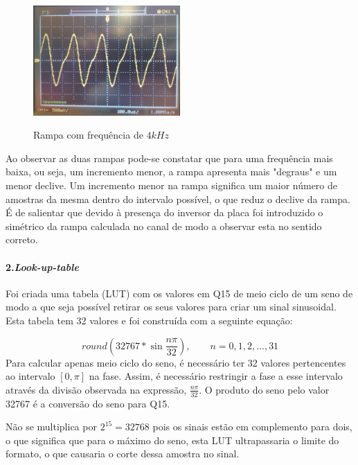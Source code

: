 \documentclass[11pt]{article}
\numberwithin{equation}{section}
\begin{document}
\begin{figure}[H]
	\centering
	\includegraphics[width=0.5\textwidth]{./P1_4kHz}~\\
	\caption{Rampa com frequência de $ 4 kHz $}
\end{figure}

Ao observar as duas rampas pode-se constatar que para uma frequência mais baixa, ou seja, um incremento menor, a rampa apresenta mais "degraus" e um menor declive. Um incremento menor na rampa significa um maior número de amostras da mesma dentro do intervalo possível, o que reduz o declive da rampa. É de salientar que devido à presença do inversor da placa foi introduzido o simétrico da rampa calculada no canal de modo a observar esta no sentido correto.
\paragraph{2.\textit{Look-up-table}} \hspace{0pt}

Foi criada uma tabela (LUT) com os valores em Q15 de meio ciclo de um seno de modo a que seja possível retirar os seus valores para criar um sinal sinusoidal. Esta tabela tem 32 valores e foi construída com a seguinte equação:

\begin{equation}
round \left(32767*\sin \dfrac{n \pi}{32} \right),  \quad \quad n=0,1,2,...,31
\end{equation}
Para calcular apenas meio ciclo do seno, é necessário ter 32 valores pertencentes ao intervalo $[0,\pi]$ na fase. Assim, é necessário restringir a fase a esse intervalo através da divisão observada na expressão, $\frac{n \pi}{32}$. O produto do seno pelo valor 32767 é a conversão do seno para Q15. 

Não se multiplica por $2 ^{15}=32768$ pois os sinais estão em complemento para dois, o que significa que para o máximo do seno, esta LUT ultrapassaria o limite do formato, o que causaria o corte dessa amostra no sinal. 
\end{document}
